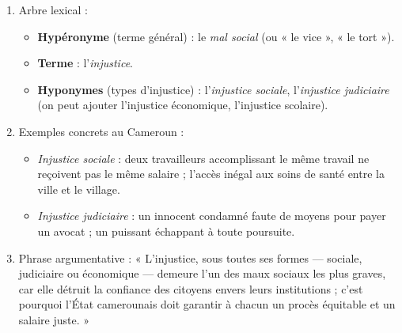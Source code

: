\documentclass[11pt]{article}
\begin{document}
\begin{corrige}

\begin{enumerate}
\item Arbre lexical :
\begin{itemize}
\item \textbf{Hypéronyme} (terme général) : le \emph{mal social} (ou « le vice », « le tort »).
\item \textbf{Terme} : l'\emph{injustice}.
\item \textbf{Hyponymes} (types d'injustice) : l'\emph{injustice sociale}, l'\emph{injustice judiciaire} (on peut ajouter l'injustice économique, l'injustice scolaire).
\end{itemize}

\item Exemples concrets au Cameroun :
\begin{itemize}
\item \emph{Injustice sociale} : deux travailleurs accomplissant le même travail ne reçoivent pas le même salaire ; l'accès inégal aux soins de santé entre la ville et le village.
\item \emph{Injustice judiciaire} : un innocent condamné faute de moyens pour payer un avocat ; un puissant échappant à toute poursuite.
\end{itemize}

\item Phrase argumentative : « L'injustice, sous toutes ses formes — sociale, judiciaire ou économique — demeure l'un des maux sociaux les plus graves, car elle détruit la confiance des citoyens envers leurs institutions ; c'est pourquoi l'État camerounais doit garantir à chacun un procès équitable et un salaire juste. »
\end{enumerate}
\end{corrige}
\end{document}
